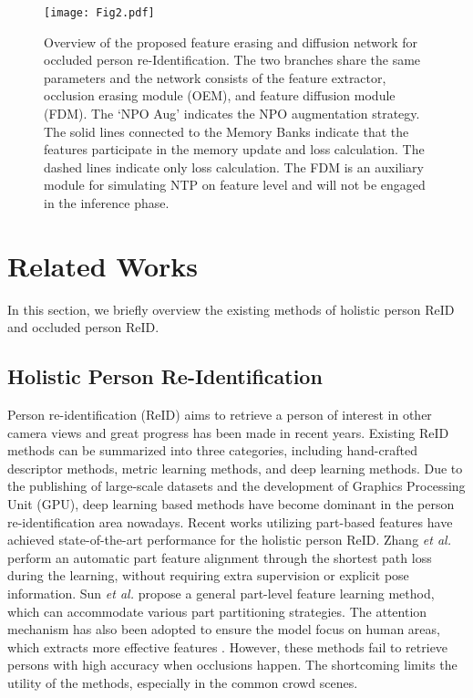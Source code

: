 \documentclass[10pt,twocolumn,letterpaper]{article}
\begin{document}
\begin{figure*}[t]
  \centering
   \texttt{[image: Fig2.pdf]}
   \caption{Overview of the proposed feature erasing and diffusion network for occluded person re-Identification. The two branches share the same parameters and the network consists of the feature extractor, occlusion erasing module (OEM), and feature diffusion module (FDM). The `NPO Aug' indicates the NPO augmentation strategy. The solid lines connected to the Memory Banks indicate that the features participate in the memory update and loss calculation. The dashed lines indicate only loss calculation. The FDM is an auxiliary module for simulating NTP on feature level and will not be engaged in the inference phase. 
   }
   \label{Fig2}
\end{figure*}


\section{Related Works}
In this section, we briefly overview the existing methods of holistic person ReID and occluded person ReID. 

\subsection{Holistic Person Re-Identification}
Person re-identification (ReID) aims to retrieve a person of interest in other camera views and great progress has been made in recent years. Existing ReID methods can be summarized into three categories, including hand-crafted descriptor methods\cite{yang2014salient,ma2014covariance}, metric learning methods\cite{zhong2017re,chen2017beyond}, and deep learning methods\cite{wang2020robust,sun2018beyond,xu2018attention}. Due to the publishing of large-scale datasets and the development of Graphics Processing Unit (GPU), deep learning based methods have become dominant in the person re-identification area nowadays. 
Recent works utilizing part-based features have achieved state-of-the-art performance for the holistic person ReID. Zhang \emph{et al.} \cite{zhang2017alignedreid} perform an automatic part feature alignment through the shortest path loss during the learning, without requiring extra supervision or explicit pose information. Sun \emph{et al.} \cite{sun2018beyond} propose a general part-level feature learning method, which can accommodate various part partitioning strategies. 
The attention mechanism has also been adopted to ensure the model focus on human areas, which extracts more effective features \cite{li2018harmonious,tay2019aanet,yang2019attention}. 
However, these methods fail to retrieve persons with high accuracy when occlusions happen. The shortcoming limits the utility of the methods, especially in the common crowd scenes.
\end{document}
